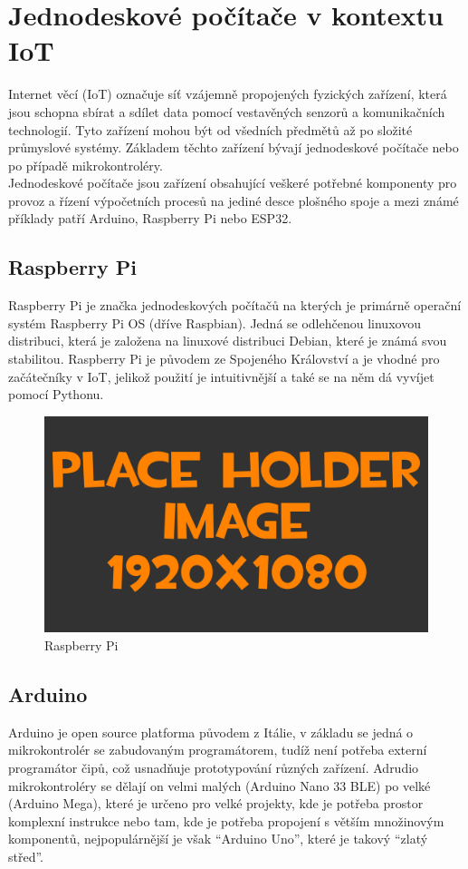 
\section{Jednodeskové počítače v kontextu IoT}
Internet věcí (IoT) označuje síť vzájemně propojených fyzických zařízení, která jsou schopna sbírat a sdílet data pomocí vestavěných senzorů a komunikačních technologií. Tyto zařízení mohou být od všedních předmětů až po složité průmyslové systémy.
Základem těchto zařízení bývají jednodeskové počítače nebo po případě mikrokontroléry.\\
Jednodeskové počítače jsou zařízení obsahující veškeré potřebné komponenty pro provoz a řízení výpočetních procesů na jediné desce plošného spoje a mezi známé příklady patří Arduino, Raspberry Pi nebo ESP32.

\subsection{Raspberry Pi}
Raspberry Pi je značka jednodeskových počítačů na kterých je primárně operační systém Raspberry Pi OS (dříve Raspbian). Jedná se odlehčenou linuxovou distribuci, která je založena na linuxové distribuci Debian, které je známá svou stabilitou. Raspberry Pi je původem ze Spojeného Království a je vhodné pro začátečníky v IoT, jelikož použití je intuitivnější a také se na něm dá vyvíjet pomocí Pythonu.

\begin{figure}[h!]
	\centering
	\includegraphics[width=\textwidth]{pictures/placeHolderFHD.png}
    	\caption{Raspberry Pi}
   	\label{fig:rasPI}
\end{figure}

\subsection{Arduino}
Arduino je open source platforma původem z Itálie, v základu se jedná o mikrokontrolér se zabudovaným programátorem, tudíž není potřeba externí programátor čipů, což usnadňuje prototypování různých zařízení. Adrudio mikrokontroléry se dělají on velmi malých (Arduino Nano 33 BLE) po velké (Arduino Mega), které je určeno pro velké projekty, kde je potřeba prostor komplexní instrukce nebo tam, kde je potřeba propojení s větším množinovým komponentů, nejpopulárnější je však “Arduino Uno”, které je takový “zlatý střed”.

